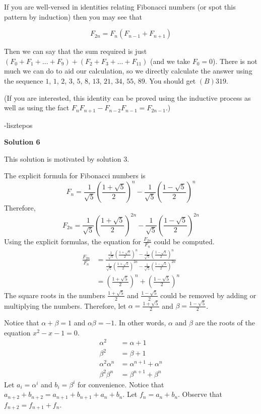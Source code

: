 \begin{enumerate}
If you are well-versed in identities relating Fibonacci numbers (or spot this pattern by induction) then you may see that

 
 \[F_{2n}=F_{n}(F_{n-1}+F_{n+1})\]

 Then we can say that the sum required is just $(F_0+F_1+...+F_9)+(F_2+F_3+...+F_{11})$ (and we take $F_0=0$). There is not much we can do to aid our calculation, so we directly calculate the answer using the sequence $1$, $1$, $2$, $3$, $5$, $8$, $13$, $21$, $34$, $55$, $89$. You should get $\boxed{(B) 319}$.

 (If you are interested, this identity can be proved using the inductive process as well as using the fact $F_{n}F_{n+1}-F_{n-2}F_{n-1}=F_{2n-1}$.)

 -lisztepos

 



\textbf{Solution 6}

This solution is motivated by solution 3.

 The explicit formula for Fibonacci numbers is
 \[F_n = \frac{1}{\sqrt{5}} \left( \frac{1 + \sqrt{5}}{2} \right)^n - \frac{1}{\sqrt{5}} \left( \frac{1 - \sqrt{5}}{2} \right)^n\]Therefore,
 \[F_{2n} = \frac{1}{\sqrt{5}} \left( \frac{1 + \sqrt{5}}{2} \right)^{2n} - \frac{1}{\sqrt{5}} \left( \frac{1 - \sqrt{5}}{2} \right)^{2n}\]Using the explicit formulas, the equation for $\frac{F_{2n}}{F_n}$ could be computed.
 \begin{align*}     \frac{F_{2n}}{F_n}     &= \frac{\frac{1}{\sqrt{5}} \left( \frac{1 + \sqrt{5}}{2} \right)^n - \frac{1}{\sqrt{5}} \left( \frac{1 - \sqrt{5}}{2} \right)^n}{\frac{1}{\sqrt{5}} \left( \frac{1 + \sqrt{5}}{2} \right)^{2n} - \frac{1}{\sqrt{5}} \left( \frac{1 - \sqrt{5}}{2} \right)^{2n}} \\     &= \left( \frac{1 + \sqrt{5}}{2} \right)^n + \left( \frac{1 - \sqrt{5}}{2} \right)^n \end{align*}
The square roots in the numbers $\frac{1 + \sqrt{5}}{2}$ and $\frac{1 - \sqrt{5}}{2}$ could be removed by adding or multiplying the numbers. Therefore, let $\alpha = \frac{1 + \sqrt{5}}{2}$ and $\beta = \frac{1 - \sqrt{5}}{2}$.

 
Notice that $\alpha + \beta = 1$ and $\alpha\beta = -1$. In other words, $\alpha$ and $\beta$ are the roots of the equation $x^2 - x - 1 = 0$.
 \begin{align*}     \alpha^2 &= \alpha + 1 \\     \beta^2 &= \beta + 1 \\     \alpha^2 \alpha^n &= \alpha^{n + 1} + \alpha^n \\     \beta^2 \beta^n &= \beta^{n + 1} + \beta^n \end{align*}
Let $a_i = \alpha^i$ and $b_i = \beta^i$ for convenience. Notice that $a_{n + 2} + b_{n + 2} = a_{n + 1} + b_{n + 1} + a_n + b_n$. Let $f_n = a_n + b_n$. Observe that $f_{n + 2} = f_{n + 1} + f_n$.


\end{enumerate}

